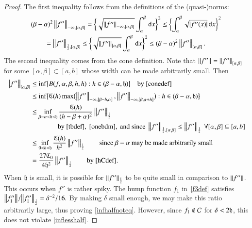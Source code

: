 \documentclass[review]{elsarticle}
\theoremstyle{definition}
\begin{document}
\begin{proof}
The first inequality follows from the definitions of the (quasi-)norms:
\begin{multline} \label{onebdm}
 (\beta - \alpha)^2 \norm[-\infty,{[\alpha,\beta]}]{f''} 
 = \biggl\{\sqrt{\norm[-\infty,{[\alpha,\beta]}]{f''}}  \int_{\alpha}^{\beta} \, \dif x \biggr\}^2 
 \le \biggl\{ \int_{\alpha}^{\beta} \sqrt{\abs{f''(x)}} \, \dif x \biggr\}^2\\
 = \norm[\frac 12,{[\alpha,\beta]}]{f''} 
 \le\biggl\{\sqrt{\norm[{[\alpha,\beta]}]{f''}}  \int_{\alpha}^{\beta} \, \dif x \biggr\}^2 
 \le  (\beta - \alpha)^2 \norm[{[\alpha,\beta]}]{f''}.
\end{multline}
The second inequality comes from the cone definition.  Note that 
$\norm{f''}  = \norm[{[\alpha,\beta]}]{f''}$  for some $[\alpha,\beta] \subset [a,b]$ whose 
width can be made arbitrarily small.  Then
\begin{align*}
\norm[{[\alpha,\beta]}]{f''}
& \le \inf\bigl\{B(f,\alpha,\beta,h,h) : h \in (\beta - \alpha,\fh) \bigr \} \quad \text{by}~\eqref{conedef} \\
& \le  \inf\bigl\{\fC(h) \max\bigl(\norm[-\infty,{[\beta - h, \alpha]}]{f''},
\norm[-\infty,{[\beta, \alpha+h]}]{f''}\bigr) : h \in (\beta - \alpha,\fh) \bigr \} \\
& \le \inf_{\beta - \alpha < h < \fh} \frac{\fC(h)}{(h-\beta+\alpha)^2}\norm[\frac 12]{f''} \\
& \qquad \qquad\text{by}~\eqref{tbdef},~\eqref{onebdm}, \text{ and since }  
\norm[{\frac12,[\alpha,\beta]}]{f''} \le \norm[\frac 12]{f''} \ \forall [\alpha,\beta] 
\subseteq [a,b] \\
& \le \inf_{0 < h < \fh} \frac{\fC(h)}{h^2}\norm[\frac 12]{f''} \qquad 
\text{since $\beta-\alpha$ may be made arbitrarily small}\\
& = \frac{27\fC_0}{4\fh^2}\norm[\frac 12]{f''} \qquad \text{by \eqref{hCdef}}.
\end{align*}
When $\fh$ is small, it is possible for $\norm[\frac 12]{f''} $ to be quite
small in comparison to $\norm{f''}$. This occurs when $f''$ is rather spiky.
The hump function $f_1$ in~\eqref{f3def}  satisfies
$
 {\norm{f_1''}}/{\norm[\frac 12]{f_1''}}  =  { \delta^{-2}}/{16}.
$
By making $\delta$ small enough, we may make this ratio arbitrarily large, thus proving 
\eqref{infhalfnoteq}. However, since $f_1
\notin \cc$ for $\delta < 2\fh$, this does not violate \eqref{inflesshalf}.
\end{proof}
\end{document}

